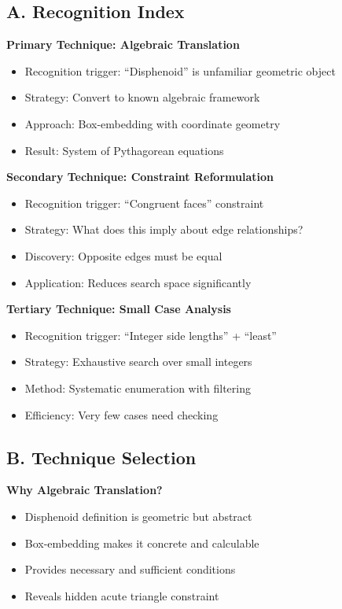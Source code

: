 \documentclass[12pt]{article}
\begin{document}
\begin{techniquesbox}

\subsection*{A. Recognition Index}

\textbf{Primary Technique: Algebraic Translation}
\begin{itemize}
    \item Recognition trigger: ``Disphenoid'' is unfamiliar geometric object
    \item Strategy: Convert to known algebraic framework
    \item Approach: Box-embedding with coordinate geometry
    \item Result: System of Pythagorean equations
\end{itemize}

\textbf{Secondary Technique: Constraint Reformulation}
\begin{itemize}
    \item Recognition trigger: ``Congruent faces'' constraint
    \item Strategy: What does this imply about edge relationships?
    \item Discovery: Opposite edges must be equal
    \item Application: Reduces search space significantly
\end{itemize}

\textbf{Tertiary Technique: Small Case Analysis}
\begin{itemize}
    \item Recognition trigger: ``Integer side lengths'' + ``least''
    \item Strategy: Exhaustive search over small integers
    \item Method: Systematic enumeration with filtering
    \item Efficiency: Very few cases need checking
\end{itemize}

\subsection*{B. Technique Selection}

\textbf{Why Algebraic Translation?}
\begin{itemize}
    \item Disphenoid definition is geometric but abstract
    \item Box-embedding makes it concrete and calculable
    \item Provides necessary and sufficient conditions
    \item Reveals hidden acute triangle constraint
\end{itemize}


\end{techniquesbox}
\end{document}
